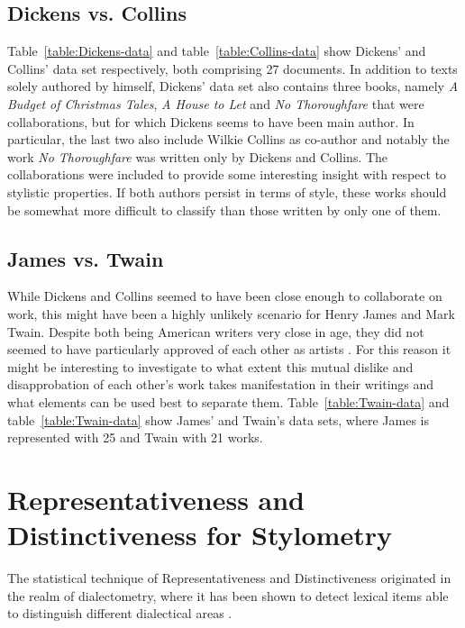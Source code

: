 \documentclass[a4paper,10pt,twoside,fleqn]{article}
\begin{document}
\subsection{Dickens vs. Collins}
Table~\ref{table:Dickens-data} and table~\ref{table:Collins-data} show Dickens'
and Collins' data set respectively, both comprising 27 documents.
In addition to texts solely authored by himself, Dickens' data set also contains
three books, namely \emph{A Budget of Christmas Tales}, \emph{A House to Let} and \emph{No Thoroughfare}
that were collaborations, but for which Dickens seems to have been main author.
In particular, the last two also include Wilkie Collins as co-author and notably the work
\emph{No Thoroughfare} was written only by Dickens and Collins.
The collaborations were included to provide some interesting insight with respect to stylistic properties.
If both authors persist in terms of style, these works should be somewhat more difficult
to classify than those written by only one of them.


\subsection{James vs. Twain}
While Dickens and Collins seemed to have been close enough to collaborate on work,
this might have been a highly unlikely scenario for Henry James and Mark Twain.
Despite both being American writers very close in age, they did not seemed to have
particularly approved of each other as artists \cite{canby1951turn}.
For this reason it might be interesting to investigate to what extent this mutual dislike and
disapprobation of each other's work takes manifestation in their writings
and what elements can be used best to separate them.
Table~\ref{table:Twain-data} and table~\ref{table:Twain-data} show
James' and Twain's data sets, where James is represented with 25 and Twain
with 21 works.






\section{Representativeness and Distinctiveness for Stylometry} \label{sec:method}
The statistical technique of Representativeness and Distinctiveness
originated in the realm of dialectometry, where it has been
shown to detect lexical items able to distinguish different dialectical
areas \cite{prokic2012detecting}.
\end{document}
